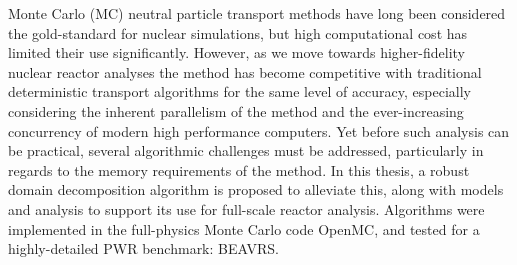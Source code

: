 \begin{abstractpage}

Monte Carlo (MC) neutral particle transport methods have long been considered
the gold-standard for nuclear simulations, but high computational cost has
limited their use significantly. However, as we move towards higher-fidelity
nuclear reactor analyses the method has become competitive with traditional
deterministic transport algorithms for the same level of accuracy, especially
considering the inherent parallelism of the method and the ever-increasing
concurrency of modern high performance computers. Yet before such analysis can
be practical, several algorithmic challenges must be addressed, particularly in
regards to the memory requirements of the method. In this thesis, a robust
domain decomposition algorithm is proposed to alleviate this, along with models
and analysis to support its use for full-scale reactor analysis. Algorithms were
implemented in the full-physics Monte Carlo code OpenMC, and tested for a
highly-detailed PWR benchmark: BEAVRS.


\end{abstractpage}
